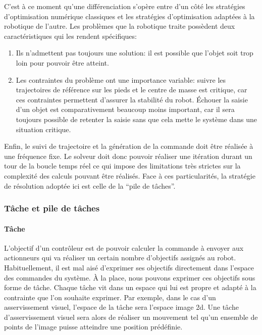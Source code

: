 C'est à ce moment qu'une différenciation s'opère entre d'un côté les
stratégies d'optimisation numérique classiques et les stratégies
d'optimisation adaptées à la robotique de l'autre. Les problèmes que
la robotique traite possèdent deux caractéristiques qui les rendent
spécifiques:
\begin{enumerate}
\item Ils n'admettent pas toujours une solution: il est possible que
  l'objet soit trop loin pour pouvoir être atteint.
\item Les contraintes du problème ont une importance variable: suivre
  les trajectoires de référence sur les pieds et le centre de masse
  est critique, car ces contraintes permettent d'assurer la stabilité
  du robot. Échouer la saisie d'un objet est comparativement beaucoup
  moins important, car il sera toujours possible de retenter la saisie
  sans que cela mette le système dans une situation critique.
\end{enumerate}

Enfin, le suivi de trajectoire et la génération de la commande doit
être réalisée à une fréquence fixe. Le solveur doit donc pouvoir
réaliser une itération durant un tour de la boucle temps réel ce qui
impose des limitations très strictes sur la complexité des calculs
pouvant être réalisés. Face à ces particularités, la stratégie de
résolution adoptée ici est celle de la ``pile de tâches''.


\subsubsection{Tâche et pile de tâches}

\paragraph{Tâche}

L'objectif d'un contrôleur est de pouvoir calculer la commande à
envoyer aux actionneurs qui va réaliser un certain nombre d'objectifs
assignés au robot. Habituellement, il est mal aisé d'exprimer ses
objectifs directement dans l'espace des commandes du système. À la
place, nous pouvons exprimer ces objectifs sous forme de tâche. Chaque
tâche vit dans un espace qui lui est propre et adapté à la contrainte
que l'on souhaite exprimer. Par exemple, dans le cas d'un
asservissement visuel, l'espace de la tâche sera l'espace image
2d. Une tâche d'asservissement visuel sera alors de réaliser un
mouvement tel qu'un ensemble de points de l'image puisse atteindre une
position prédéfinie.

